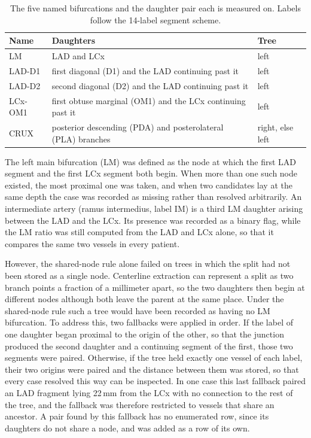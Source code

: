 \begin{table}[htbp]
  \centering
  \caption{The five named bifurcations and the daughter pair each is measured on. Labels follow the 14-label segment scheme.}
  \label{tab:daughter-ratio-named}
  \begin{tabular}{lll}
    \toprule
    Name & Daughters & Tree \\
    \midrule
    LM & LAD and LCx & left \\
    LAD-D1 & first diagonal (D1) and the LAD continuing past it & left \\
    LAD-D2 & second diagonal (D2) and the LAD continuing past it & left \\
    LCx-OM1 & first obtuse marginal (OM1) and the LCx continuing past it & left \\
    CRUX & posterior descending (PDA) and posterolateral (PLA) branches & right, else left \\
    \bottomrule
  \end{tabular}
\end{table}

The left main bifurcation (LM) was defined as the node at which the first LAD segment and the first LCx segment both begin.
When more than one such node existed, the most proximal one was taken, and when two candidates lay at the same depth the case was recorded as missing rather than resolved arbitrarily.
An intermediate artery (ramus intermedius, label IM) is a third LM daughter arising between the LAD and the LCx.
Its presence was recorded as a binary flag, while the LM ratio was still computed from the LAD and LCx alone, so that it compares the same two vessels in every patient.

However, the shared-node rule alone failed on trees in which the split had not been stored as a single node.
Centerline extraction can represent a split as two branch points a fraction of a millimeter apart, so the two daughters then begin at different nodes although both leave the parent at the same place.
Under the shared-node rule such a tree would have been recorded as having no LM bifurcation.
To address this, two fallbacks were applied in order.
If the label of one daughter began proximal to the origin of the other, so that the junction produced the second daughter and a continuing segment of the first, those two segments were paired.
Otherwise, if the tree held exactly one vessel of each label, their two origins were paired and the distance between them was stored, so that every case resolved this way can be inspected.
In one case this last fallback paired an LAD fragment lying 22\,mm from the LCx with no connection to the rest of the tree, and the fallback was therefore restricted to vessels that share an ancestor.
A pair found by this fallback has no enumerated row, since its daughters do not share a node, and was added as a row of its own.

